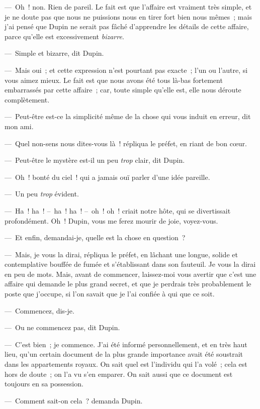 \documentclass[french,twoside]{book} %
\begin{document}
— Oh ! non. Rien de pareil. Le fait est que l’affaire est vraiment très simple, et je ne doute pas que nous ne puissions nous en tirer fort bien nous mêmes ; mais j’ai pensé que Dupin ne serait pas fâché d’apprendre les détails de cette affaire, parce qu’elle est excessivement \emph{bizarre}.\par
— Simple et bizarre, dit Dupin.\par
— Mais oui ; et cette expression n’est pourtant pas exacte ; l’un ou l’autre, si vous aimez mieux. Le fait est que nous avons été tous là-bas fortement embarrassés par cette affaire ; car, toute simple qu’elle est, elle nous déroute complètement.\par
— Peut-être est-ce la simplicité même de la chose qui vous induit en erreur, dit mon ami.\par
— Quel non-sens nous dites-vous là ! répliqua le préfet, en riant de bon cœur.\par
— Peut-être le mystère est-il un peu \emph{trop} clair, dit Dupin.\par
— Oh ! bonté du ciel ! qui a jamais ouï parler d’une idée pareille.\par
— Un peu \emph{trop} évident.\par
— Ha ! ha ! – ha ! ha ! – oh ! oh ! criait notre hôte, qui se divertissait profondément. Oh ! Dupin, vous me ferez mourir de joie, voyez-vous.\par
— Et enfin, demandai-je, quelle est la chose en question ?\par
— Mais, je vous la dirai, répliqua le préfet, en lâchant une longue, solide et contemplative bouffée de fumée et s’établissant dans son fauteuil. Je vous la dirai en peu de mots. Mais, avant de commencer, laissez-moi vous avertir que c’est une affaire qui demande le plus grand secret, et que je perdrais très probablement le poste que j’occupe, si l’on savait que je l’ai confiée à qui que ce soit.\par
— Commencez, dis-je.\par
— Ou ne commencez pas, dit Dupin.\par
— C’est bien ; je commence. J’ai été informé personnellement, et en très haut lieu, qu’un certain document de la plus grande importance avait été soustrait dans les appartements royaux. On sait quel est l’individu qui l’a volé ; cela est hors de doute ; on l’a vu s’en emparer. On sait aussi que ce document est toujours en sa possession.\par
— Comment sait-on cela ? demanda Dupin.\par
\end{document}

